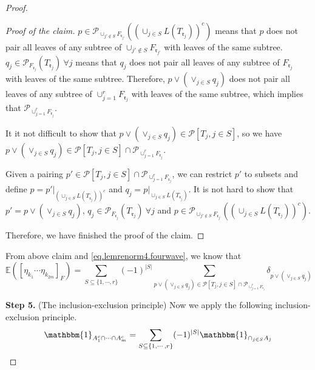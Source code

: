 \begin{proof}
 \begin{proof}[Proof of the claim] $p\in \mathcal{P}_{\cup_{j'\notin S} F_{\mathfrak{r}_{j'}}}((\cup_{j\in S}L(T_{\mathfrak{r}_j}))^c)$ means that $p$ does not pair all leaves of any subtree of $\cup_{j'\notin S} F_{\mathfrak{r}_{j'}}$ with leaves of the same subtree. $q_j\in 
 \mathcal{P}_{F_{\mathfrak{r}_j}}(T_{\mathfrak{r}_j})\ \forall j$ means that $q_j$ does not pair all leaves of any subtree of $F_{\mathfrak{r}_j}$ with leaves of the same subtree. Therefore, $p\vee (\vee_{j\in S} q_j)$ does not pair all leaves of any subtree of $\cup_{j=1}^r F_{\mathfrak{r}_{j}}$ with leaves of the same subtree, which implies that $\mathcal{P}_{\cup_{j=1}^r F_{\mathfrak{r}_{j}}}$.
 
 It it not difficult to show that $p\vee (\vee_{j\in S} q_j)\in \mathcal{P}[T_j,j\in S]$, so we have $p\vee (\vee_{j\in S} q_j)\in \mathcal{P}[T_j,j\in S]\cap \mathcal{P}_{\cup_{j=1}^r F_{\mathfrak{r}_{j}}}$.
 
 Given a pairing $p'\in \mathcal{P}[T_j,j\in S]\cap \mathcal{P}_{\cup_{j=1}^r F_{\mathfrak{r}_{j}}}$, we can restrict $p'$ to subsets and define $p = p'|_{(\cup_{j\in S}L(T_{\mathfrak{r}_j}))^c}$ and $q_j = p|_{\cup_{j\in S}L(T_{\mathfrak{r}_j})}$. It is not hard to show that $p'=p\vee (\vee_{j\in S} q_j)$, $q_j\in 
 \mathcal{P}_{F_{\mathfrak{r}_j}}(T_{\mathfrak{r}_j})\ \forall j$ and $p\in \mathcal{P}_{\cup_{j'\notin S} F_{\mathfrak{r}_{j'}}}((\cup_{j\in S}L(T_{\mathfrak{r}_j}))^c)$.
 
 Therefore, we have finished the proof of the claim.
 \end{proof}
 
 From above claim and \eqref{eq.lemrenorm4.fourwave}, we know that 
 \begin{equation}
  \mathbb{E}([\eta_{k_1}\cdots \eta_{k_{2m}}]_F)=\sum_{S\subseteq\{1,\cdots,r\}}(-1)^{|S|}\sum_{p\vee (\vee_{j\in S} q_j)\in \mathcal{P}[T_j,j\in S]\cap \mathcal{P}_{\cup_{j=1}^r F_{\mathfrak{r}_{j}}}} 
  \delta_{p\vee (\vee_{j\in S} q_j)}
 \end{equation}
  
 
 \textbf{Step 5.} (The inclusion-exclusion principle) Now we apply the following inclusion-exclusion principle.
 \begin{equation}\label{eq.inclu-exclu.fourwave}
  \mathbbm{1}_{A_1^c\cap\cdots\cap A_m^c} = \sum_{S\subseteq\{1,\cdots,r\}}(-1)^{|S|} \mathbbm{1}_{\cap_{j\in S} A_j}
 \end{equation}
 

\end{proof}
